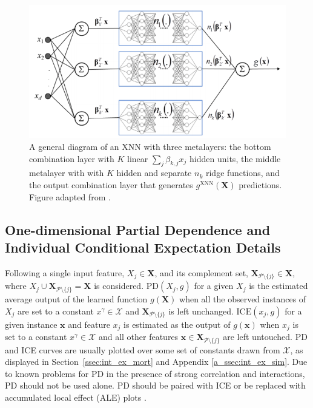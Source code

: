 \documentclass[information,article,accept,moreauthors,pdftex]{Definitions/mdpi}
\begin{document}
{\begin{figure}[H]
	\centering
	\includegraphics[width=12cm]{img/xnn_arch.png}
	\caption{{A general diagram} of an XNN with three metalayers: the bottom combination layer with  $K$ linear $\sum_j\beta_{k,j}x_j$ hidden units, the middle metalayer with with $K$ hidden and separate $n_k$ ridge functions, and the output combination layer that generates $g^{\text{XNN}}(\mathbf{X})$ predictions. Figure adapted from \citet{wf_xnn}.}
	\label{fig:xnn_arch}%
\end{figure} 

\subsection{One-dimensional Partial Dependence and Individual Conditional Expectation Details}\label{a_ssec:pd_ice}

Following \citet{esl} a single input feature, $X_j \in \mathbf{X}$, and its complement set, $\mathbf{X}_{\mathcal{P} \setminus \{j\}} \in \mathbf{X}$, where $X_j \cup \mathbf{X}_{\mathcal{P} \setminus \{j\}} = \mathbf{X}$ is considered. $\text{PD}(X_j, g)$ for a given $X_j$ is the estimated average output of the learned function $g(\mathbf{X})$ when all the observed instances of $X_j$ are set to a constant $x^\gamma \in \mathcal{X}$ and $\mathbf{X}_{\mathcal{P} \setminus \{j\}}$ is left unchanged. $\text{ICE}(x_j, g)$ for a given instance $\mathbf{x}$ and feature $x_j$ is estimated as the output of $g(\mathbf{x})$ when $x_j$ is set to a constant $x^\gamma \in \mathcal{X}$ and all other features $\mathbf{x} \in \mathbf{X}_{\mathcal{P} \setminus \{j\}}$ are left untouched. PD and ICE curves are usually plotted over some set of constants drawn from $\mathcal{X}$, as displayed in Section~\ref{ssec:int_ex_mort} and Appendix \ref{a_ssec:int_ex_sim}. Due to known problems for PD in the presence of strong correlation and interactions, PD should not be used alone. PD should be paired with ICE or be replaced with accumulated local effect (ALE) plots \cite{ice_plots,ale_plot}.

}
\end{document}

